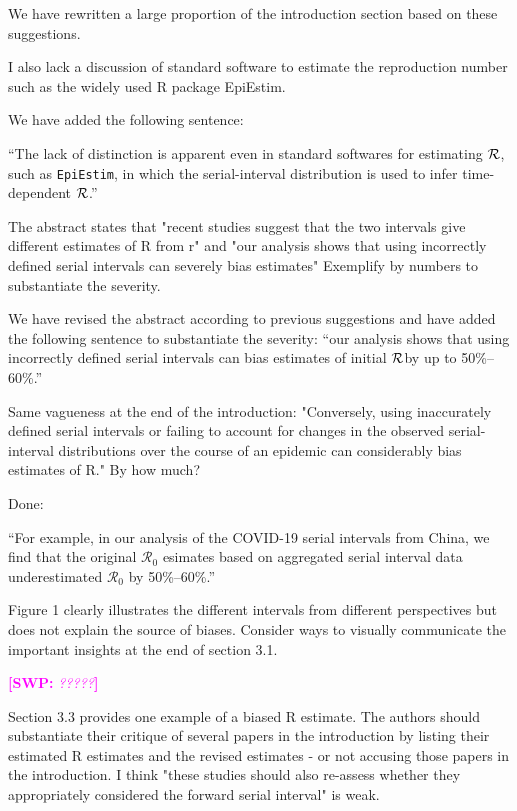 \documentclass[12pt]{article}
\newcommand{\RR}{\ensuremath{{\cal R}}}
\newcommand{\Ro}{\ensuremath{{\mathcal R}_{0}}\xspace}
\newcommand{\revtext}{\textsf}
\newcommand{\comment}[3]{\textcolor{#1}{\textbf{[#2: }\textsl{#3}\textbf{]}}}
\newcommand{\swp}[1]{\comment{magenta}{SWP}{#1}}
\begin{document}
We have rewritten a large proportion of the introduction section based on these suggestions.

\revtext{I also lack a discussion of standard software to estimate the reproduction number such as the widely used R package EpiEstim.}

We have added the following sentence:

``The lack of distinction is apparent even in standard softwares for estimating \RR, such as \texttt{EpiEstim}, in which the serial-interval distribution is used to infer time-dependent \RR \citep{thompson2019improved}.''

\revtext{The abstract states that "recent studies suggest that the two intervals give different estimates of R from r" and "our analysis shows that using incorrectly defined serial intervals can severely bias estimates" Exemplify by numbers to substantiate the severity.}

We have revised the abstract according to previous suggestions and have added the following sentence to substantiate the severity: ``our analysis shows that using incorrectly defined serial intervals can bias estimates of initial \RR by up to 50\%--60\%.''

\revtext{Same vagueness at the end of the introduction: "Conversely, using inaccurately defined serial intervals or failing to account for changes in the observed serial-interval distributions over the course of an epidemic can considerably bias estimates of R." By how much?}

Done:

``For example, in our analysis of the COVID-19 serial intervals from China, we find that the original \Ro esimates based on aggregated serial interval data underestimated \Ro by 50\%--60\%.''

\revtext{Figure 1 clearly illustrates the different intervals from different perspectives but does not explain the source of biases. Consider ways to visually communicate the important insights at the end of section 3.1.}

\swp{?????}

\revtext{Section 3.3 provides one example of a biased R estimate. The authors should substantiate their critique of several papers in the introduction by listing their estimated R estimates and the revised estimates - or not accusing those papers in the introduction. I think "these studies should also re-assess whether they appropriately considered the forward serial interval" is weak.}
\end{document}
